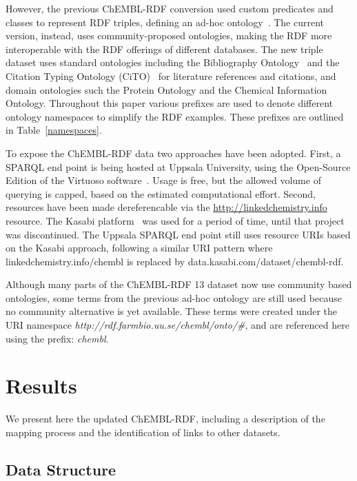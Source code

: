 \documentclass[10pt]{bmc_article}
\newenvironment{bmcformat}{\begin{raggedright}\baselineskip20pt\sloppy\setboolean{publ}{false}}{\end{raggedright}\baselineskip20pt\sloppy}
\begin{document}
\begin{bmcformat}
However, the previous ChEMBL-RDF conversion used custom predicates and classes to represent RDF triples, defining
an ad-hoc ontology~\cite{Willighagen2011}. The current version, instead, uses community-proposed
ontologies, making the RDF more interoperable with the RDF offerings of different databases. 
The new triple dataset uses standard ontologies
including the Bibliography Ontology~\cite{Giasson2011} and the Citation Typing Ontology (CiTO)~\cite{Shotton2010} for literature
references and citations, and domain ontologies such the Protein Ontology\cite{Sidhu2006} and the Chemical Information
Ontology\cite{Hastings2011}. Throughout this paper various prefixes are used to denote different ontology 
namespaces to simplify the RDF examples. These prefixes are outlined in Table~\ref{namespaces}.

To expose the ChEMBL-RDF data two approaches have been adopted. First, a SPARQL end point is being
hosted at Uppsala University, using the Open-Source Edition of the Virtuoso software~\cite{Virtuoso}. Usage is free, but the
allowed volume of querying is capped, based on the estimated computational effort. Second, resources have
been made dereferencable via the \url{http://linkedchemistry.info} resource. The Kasabi
platform~\cite{kasabi} was used for a period of time, until that project was discontinued.
The Uppsala SPARQL end point still uses resource URIs based on the Kasabi approach, following a similar
URI pattern where linkedchemistry.info/chembl is replaced by data.kasabi.com/dataset/chembl-rdf.

Although many parts of the ChEMBL-RDF 13 dataset now use community based ontologies, some 
terms from the previous ad-hoc ontology are still used because no community alternative is yet available. 
These terms were created under the 
URI namespace \textit{http://rdf.farmbio.uu.se/chembl/onto/\#}, and are referenced here using the
prefix: \textit{chembl}.


\section*{Results}
\label{s3}

We present here the updated ChEMBL-RDF, including a description of the mapping process 
and the identification of links to other datasets.

\subsection*{Data Structure}


\end{bmcformat}
\end{document}

